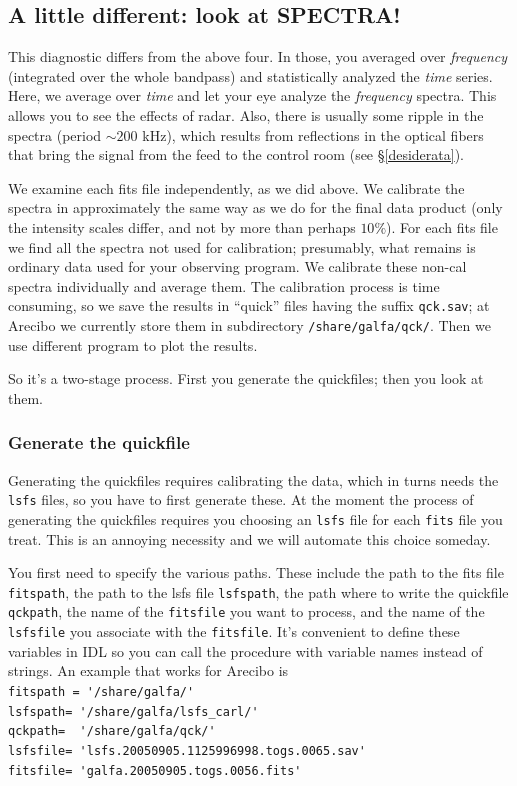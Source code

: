 \documentclass[psfig,preprint]{aastex}
\begin{document}
\subsection{A little different: look at SPECTRA!} \label{quickfile}

	This diagnostic differs from the above four.  In those, you
averaged over {\it frequency} (integrated over the whole bandpass) and
statistically analyzed the {\it time} series.  Here, we average over {\it
time} and let your eye analyze the {\it frequency} spectra. This allows
you to see the effects of radar. Also, there is usually some ripple in
the spectra (period $\sim 200$ kHz), which results from reflections in
the optical fibers that bring the signal from the feed to the control
room (see \S \ref{desiderata}).

	We examine each fits file independently, as we did above.  We
calibrate the spectra in approximately the same way as we do for the
final data product (only the intensity scales differ, and not by more
than perhaps $10\%$).  For each fits file we find all the spectra not
used for calibration; presumably, what remains is ordinary data used for
your observing program.  We calibrate these non-cal spectra individually
and average them.  The calibration process is time consuming, so we save
the results in ``quick'' files having the suffix \verb$qck.sav$; at
Arecibo we currently store them in subdirectory \verb$/share/galfa/qck/$. 
Then we use different program to plot the results. 

	So it's a two-stage process. First you generate the quickfiles;
then you look at them. 

\subsubsection{Generate the quickfile} 

	Generating the quickfiles requires calibrating the data, which
in turns needs the \verb$lsfs$ files, so you have to first generate
these.  At the moment the process of generating the quickfiles requires
you choosing an \verb$lsfs$ file for each \verb$fits$ file you treat. 
This is an annoying necessity and we will automate this choice someday. 

	You first need to specify the various paths.  These include the
path to the fits file \verb$fitspath$, the path to the lsfs file
\verb$lsfspath$, the path where to write the quickfile \verb$qckpath$,
the name of the \verb$fitsfile$ you want to process, and the name of the
\verb$lsfsfile$ you associate with the \verb$fitsfile$.  
It's convenient to define these variables in IDL so you can call the
procedure with variable names instead of strings.  An example that works
for Arecibo is \\
\verb$fitspath = '/share/galfa/'$ \\
\verb$lsfspath= '/share/galfa/lsfs_carl/'$ \\
\verb$qckpath=  '/share/galfa/qck/'$ \\
\verb$lsfsfile= 'lsfs.20050905.1125996998.togs.0065.sav'$ \\
\verb$fitsfile= 'galfa.20050905.togs.0056.fits'$ 
\end{document}
